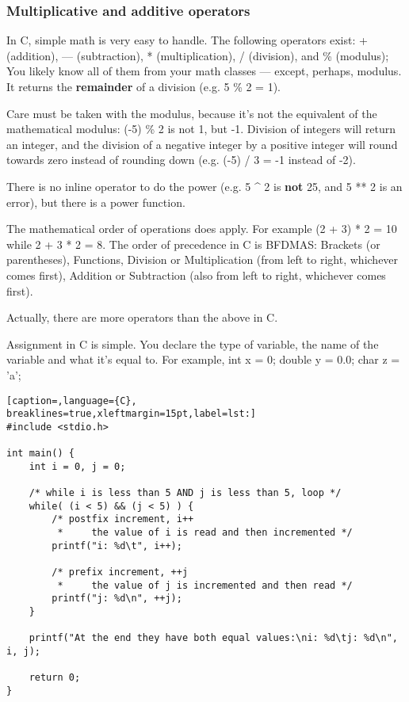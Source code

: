 \subsubsection{Multiplicative and additive operators}
In C, simple math is very easy to handle. The following operators exist: +
(addition), --- (subtraction), * (multiplication), / (division), and \%
(modulus); You likely know all of them from your math classes --- except,
perhaps, modulus. It returns the \textbf{remainder} of a division (e.g. 5 \% 2
= 1). 

Care must be taken with the modulus, because it's not the equivalent of the
mathematical modulus: (-5) \% 2 is not 1, but -1. Division of integers will
return an integer, and the division of a negative integer by a positive integer
will round towards zero instead of rounding down (e.g. (-5) / 3 = -1 instead of
-2).

There is no inline operator to do the power (e.g. 5 \^{} 2 is \textbf{not} 25,
and 5 ** 2 is an error), but there is a power function.

The mathematical order of operations does apply. For example (2 + 3) * 2 = 10
while 2 + 3 * 2 = 8. The order of precedence in C is BFDMAS: Brackets (or
parentheses), Functions, Division or Multiplication (from left to right,
whichever comes first), Addition or Subtraction (also from left to right,
whichever comes first).

Actually, there are more operators than the above in C.

Assignment in C is simple. You declare the type of variable, the name of the
variable and what it's equal to. For example, int x = 0; double y = 0.0; char z
= 'a';

\lstset{basicstyle=\scriptsize, numbers=left, captionpos=b, tabsize=4}
\begin{lstlisting}[caption=,language={C},
breaklines=true,xleftmargin=15pt,label=lst:]
#include <stdio.h>

int main() {
	int i = 0, j = 0;
	
	/* while i is less than 5 AND j is less than 5, loop */
	while( (i < 5) && (j < 5) ) {
		/* postfix increment, i++
		 *     the value of i is read and then incremented */
		printf("i: %d\t", i++);
		
		/* prefix increment, ++j 
		 *     the value of j is incremented and then read */
		printf("j: %d\n", ++j);
	}
	
	printf("At the end they have both equal values:\ni: %d\tj: %d\n", i, j);
	
	return 0;
}
\end{lstlisting}

